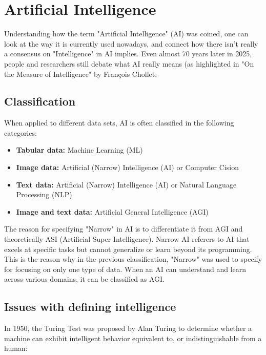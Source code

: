 \section{Artificial Intelligence}

\par
Understanding how the term "Artificial Intelligence" (AI) was coined, one can
look at the way it is currently used nowadays, and connect how there isn't
really a consensus on "Intelligence" in AI implies. Even almost 70 years later
in 2025, people and researchers still debate what AI really means (as
highlighted in "On the Measure of Intelligence" by François
Chollet\cite{DBLP:journals/corr/abs-1911-01547}.

\subsection{Classification}

\par
When applied to different data sets, AI is often classified in the following
categories:

\begin{itemize}
	\item \textbf{Tabular data:} Machine Learning (ML)
	\item \textbf{Image data:} Artificial (Narrow) Intelligence (AI) or Computer
	      Cision
	\item \textbf{Text data:} Artificial (Narrow) Intelligence (AI) or Natural
	      Language Processing (NLP)
	\item \textbf{Image and text data:} Artificial General Intelligence (AGI)
\end{itemize}

\par
The reason for specifying "Narrow" in AI is to differentiate it from AGI and
theoretically ASI (Artificial Super Intelligence). Narrow AI referers to AI that
excels at specific tasks but cannot generalize or learn beyond its programming.
This is the reason why in the previous classification, "Narrow" was used to
specify for focusing on only one type of data. When an AI can understand and
learn across various domains, it can be classified as AGI.

\subsection{Issues with defining intelligence}

\par
In 1950, the Turing Test was proposed by Alan Turing to determine whether a
machine can exhibit intelligent behavior equivalent to, or indistinguishable
from a human:

